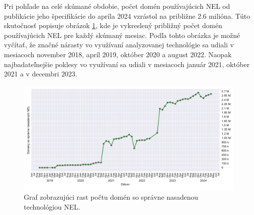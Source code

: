 Pri pohľade na celé skúmané obdobie, počet domén používajúcich NEL od publikácie jeho špecifikácie do apríla 2024 vzrástol na približne 2.6 milióna. 
Túto skutočnosť popisuje obrázok \ref{fig:httparchive-nel-deployment}, kde je vykreslený približný počet domén používajúcich NEL pre každý skúmaný mesiac.
Podľa tohto obrázka je možné vyčítať, že značné nárasty vo využívaní analyzovanej technológie sa udiali v mesiacoch november 2018, apríl 2019, október 2020 a august 2022.
Naopak najbadateľnejšie poklesy vo využívaní sa udiali v mesiacoch január 2021, október 2021 a v decembri 2023.

\begin{figure}[!htb]
\begin{center}
 \includegraphics[scale=0.59]{obrazky-figures/httparchive_nel_deployment.pdf}
 \caption{Graf zobrazujúci rast počtu domén so správne nasadenou technológiou NEL.}
 \label{fig:httparchive-nel-deployment}
\end{center}
\end{figure}

